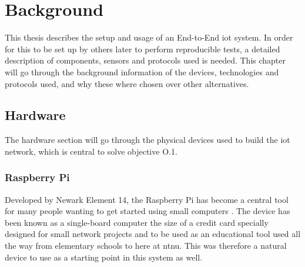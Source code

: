 \chapter{Background}
\label{chp:background} 

This thesis describes the setup and usage of an End-to-End \gls{iot} system. In order for this to be set up by others later to perform reproducible tests, a detailed description of components, sensors and protocols used is needed. This chapter will go through the background information of the devices, technologies and protocols used, and why these where chosen over other alternatives. 






\section{Hardware}

The hardware section will go through the physical devices used to build the \gls{iot} network, which is central to solve objective O.1. 

\subsection{Raspberry Pi}

Developed by Newark Element 14, the Raspberry Pi has become a central tool for many people wanting to get started using small computers \cite{newark}. The device has been known as a single-board computer the size of a credit card specially designed for small network projects and to be used as an educational tool used all the way from elementary schools to here at \gls{ntnu}. This was therefore a natural device to use as a starting point in this system as well. 


